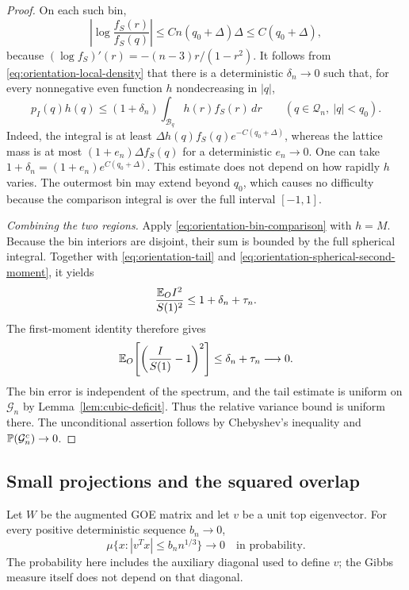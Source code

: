 \begin{proof}
On each such bin,
\[
 \left|\log\frac{f_S(r)}{f_S(q)}\right|
 \le Cn(q_0+\Delta)\Delta\le C(q_0+\Delta),
\]
because $(\log f_S)'(r)=-(n-3)r/(1-r^2)$.
It follows from \eqref{eq:orientation-local-density} that there is a
deterministic $\delta_n\to0$ such that, for every nonnegative even function
$h$ nondecreasing in $|q|$,
\begin{equation}
 p_I(q)h(q)
 \le (1+\delta_n)\int_{\mathcal B_q}h(r)f_S(r)\,dr
 \qquad(q\in\mathcal Q_n,\ |q|<q_0).
 \label{eq:orientation-bin-comparison}
\end{equation}
Indeed, the integral is at least
$\Delta h(q)f_S(q)e^{-C(q_0+\Delta)}$, whereas the lattice mass is at most
$(1+e_n)\Delta f_S(q)$ for a deterministic $e_n\to0$.
One can take $1+\delta_n=(1+e_n)e^{C(q_0+\Delta)}$.
This estimate does not depend on how rapidly $h$ varies.
The outermost bin may extend beyond $q_0$, which causes no difficulty
because the comparison integral is over the full interval $[-1,1]$.

\smallskip\noindent\emph{Combining the two regions.}
Apply \eqref{eq:orientation-bin-comparison} with $h=M$. Because the bin
interiors are disjoint, their sum is bounded by the full spherical integral.  Together with \eqref{eq:orientation-tail} and
\eqref{eq:orientation-spherical-second-moment}, it yields
\[
 \frac{\mathbb E_O I^2}{S(1)^2}\le1+\delta_n+\tau_n.
\]
The first-moment identity therefore gives
\begin{equation}
 \mathbb E_O\!\left[\left(\frac I{S(1)}-1\right)^2\right]
 \le\delta_n+\tau_n\longrightarrow0.
 \label{eq:orientation-relative-variance}
\end{equation}
The bin error is independent of the spectrum, and the tail estimate is
uniform on $\mathcal G_n$ by Lemma~\ref{lem:cubic-deficit}.  Thus the
relative variance bound is uniform there. The unconditional assertion
follows by Chebyshev's inequality and $\mathbb P(\mathcal G_n^c)\to0$.
\end{proof}

\subsection{Small projections and the squared overlap}

\begin{theorem}
\label{thm:static-small-ball}
Let $W$ be the augmented GOE matrix and let $v$ be a unit top eigenvector.
For every positive deterministic sequence $b_n\to0$,
\begin{equation}
 \mu\{x:|v^Tx|\le b_n n^{1/3}\}
 \longrightarrow0
 \quad\text{in probability}.
 \label{eq:static-small-ball}
\end{equation}
The probability here includes the auxiliary diagonal used to define $v$;
the Gibbs measure itself does not depend on that diagonal.
\end{theorem}

